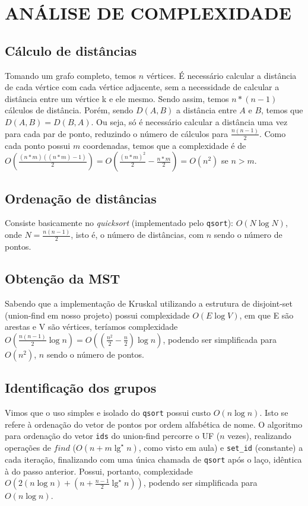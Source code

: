 \chapter{ANÁLISE DE COMPLEXIDADE}\label{cap-analise-complexidade}
\section{Cálculo de distâncias}
Tomando um grafo completo, temos $n$ vértices. É necessário calcular a distância de cada vértice com cada vértice adjacente, sem a necessidade de calcular a distância entre um vértice k e ele mesmo. Sendo assim, temos $n*(n-1)$ cálculos de distância. Porém, sendo $D(A,B)$ a distância entre $A$ e $B$, temos que $D(A,B) = D(B,A)$. Ou seja, só é necessário calcular a distância uma vez para cada par de ponto, reduzindo o número de cálculos para $\frac{n(n-1)}{2}$. Como cada ponto possui $m$ coordenadas, temos que a complexidade é de $O\left(\frac{(n*m)((n*m)-1)}{2}\right) = O\left(\frac{(n*m)^2}{2} - \frac{n*m}{2}\right) = O(n^2)$ se $n > m$.

\section{Ordenação de distâncias}
Consiste basicamente no \textit{quicksort} (implementado pelo \texttt{qsort}): $O(N \log{N})$, onde $N = \frac{n(n-1)}{2}$, isto é, o número de distâncias, com $n$ sendo o número de pontos.

\section{Obtenção da MST}
Sabendo que a implementação de Kruskal utilizando a estrutura de disjoint-set (union-find em nosso projeto) possui complexidade $O(E \log{V})$, em que E são arestas e V são vértices, teríamos complexidade $O\left(\frac{n(n-1)}{2}\log{n}\right) = O\left((\frac{n^2}{2}-\frac{n}{2})\log{n}\right)$, podendo ser simplificada para $O(n^2)$, $n$ sendo o número de pontos.

\section{Identificação dos grupos}
Vimos que o uso simples e isolado do \texttt{qsort} possui custo $O(n \log{n})$. Isto se refere à ordenação do vetor de pontos por ordem alfabética de nome. O algoritmo para ordenação do vetor \texttt{ids} do union-find percorre o UF ($n$ vezes), realizando operações de $find$ ($O(n+m\lg^{\star}{n})$, como visto em aula) e \texttt{set\_id} (constante) a cada iteração, finalizando com uma única chamada de \texttt{qsort} após o laço, idêntica à do passo anterior. Possui, portanto, complexidade $O(2(n \log{n}) + (n+\frac{n-1}{2}\lg^{\star}{n}))$, podendo ser simplificada para $O(n \log n)$.
